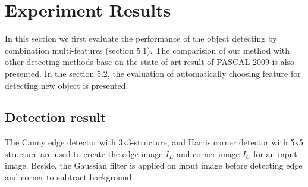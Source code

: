 \section{Experiment Results}
\label{sec:results}
In this section we first evaluate the performance of the object
detecting by combination multi-features
(section 5.1). The comparision of our method with other detecting methods base on the state-of-art
result of PASCAL 2009 is also presented. In the section 5.2, the evaluation of automatically
choosing feature for detecting new object is presented. 
\subsection{Detection result}
The Canny edge detector with 3x3-structure, and Harris corner detector with 5x5 structure are used to create the edge image-$I_E$ and corner image-$I_C$ for an input image. Beside, the Gaussian filter is applied on input image before detecting edge and corner to subtract background.

